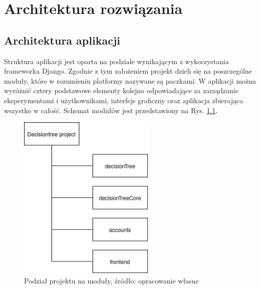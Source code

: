 \chapter{Architektura rozwiązania}
\section{Architektura aplikacji}
Struktura aplikacji jest oparta na podziale wynikającym z wykorzystania frameworka Django. Zgodnie z tym założeniem projekt dzieli się na poszczególne moduły, które w rozumieniu platformy nazywane są paczkami.  W aplikacji można wyróżnić cztery podstawowe elementy kolejno odpowiadające za zarządzanie eksperymentami i użytkownikami, interfejs graficzny oraz aplikacja zbierająca wszystko w całość. Schemat modułów jest przedstawiony na Rys. \ref{rys4_packages}. 

\begin{figure}[htb]
	\centering
	\includegraphics[height=8cm]{grafika/packages.eps}
	\caption{Podział projektu na moduły, źródło: opracowanie własne}
	\label{rys4_packages}
\end{figure}

